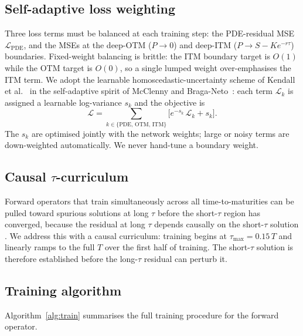 \documentclass[preprint,12pt]{elsarticle}
\begin{document}
\subsection{Self-adaptive loss weighting}
\label{sec:adaptive}
Three loss terms must be balanced at each training step: the PDE-residual MSE
$\mathcal{L}_{\mathrm{PDE}}$, and the MSEs at the deep-OTM ($P\to0$) and
deep-ITM ($P\to S - Ke^{-r\tau}$) boundaries. Fixed-weight balancing is brittle:
the ITM boundary target is $O(1)$ while the OTM target is $O(0)$, so a single
lumped weight over-emphasises the ITM term. We adopt the learnable
homoscedastic-uncertainty scheme of Kendall et al.~\citep{kendall2018multitask} in the
self-adaptive spirit of McClenny and Braga-Neto~\citep{mcclenny2023self}: each term $\mathcal{L}_k$ is
assigned a learnable log-variance $s_k$ and the objective is
\begin{equation}
  \mathcal{L} = \sum_{k\in\{\mathrm{PDE},\,\mathrm{OTM},\,\mathrm{ITM}\}}
               \bigl[e^{-s_k}\,\mathcal{L}_k + s_k\bigr].
  \label{eq:adaptive}
\end{equation}
The $s_k$ are optimised jointly with the network weights; large or noisy terms
are down-weighted automatically. We never hand-tune a boundary weight.

\subsection{Causal \texorpdfstring{$\tau$}{tau}-curriculum}
\label{sec:curriculum}
Forward operators that train simultaneously across all time-to-maturities can be
pulled toward spurious solutions at long $\tau$ before the short-$\tau$ region
has converged, because the residual at long $\tau$ depends causally on the
short-$\tau$ solution \citep{wang2024respecting}. We address this with a causal
curriculum: training begins at $\tau_{\mathrm{max}} = 0.15\,T$ and linearly ramps
to the full $T$ over the first half of training. The short-$\tau$ solution is
therefore established before the long-$\tau$ residual can perturb it.

\subsection{Training algorithm}
Algorithm~\ref{alg:train} summarises the full training procedure for the forward
operator.
\end{document}
